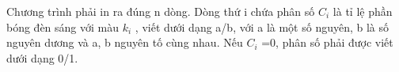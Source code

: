 Chương trình phải in ra đúng n dòng. Dòng thứ i chứa phân số $C_{i}$   là tỉ lệ phần bóng đèn sáng với màu $k_{i}$   , viết dưới dạng a/b, với a là một số nguyên, b là số nguyên dương và a, b nguyên tố cùng nhau. Nếu $C_{i}$   =0, phân số phải được viết dưới dạng 0/1.